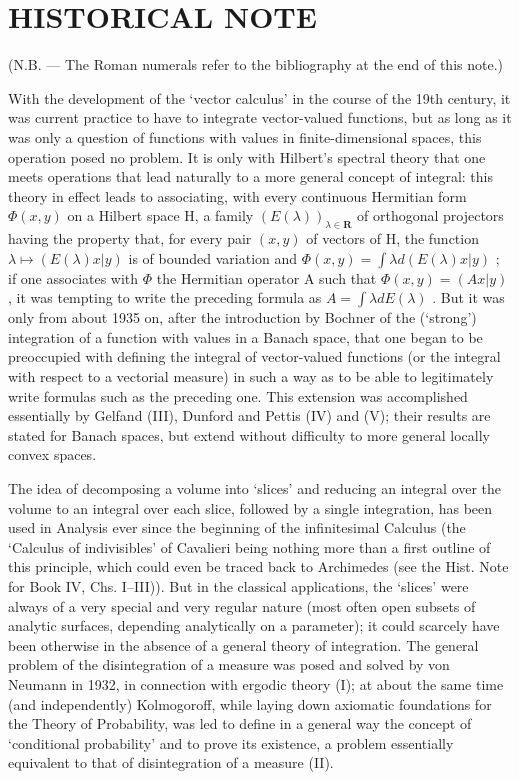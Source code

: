 \chapter*{HISTORICAL NOTE}
{}

(N.B. --- The Roman numerals refer to the bibliography at the end of this note.)

With the development of the `vector calculus' in the course of the 19th century, it was current practice to have to integrate vector-valued functions, but as long as it was only a question of functions with values in finite-dimensional spaces, this operation posed no problem. It is only with Hilbert's spectral theory that one meets operations that lead naturally to a more general concept of integral: this theory in effect leads to associating, with every continuous Hermitian form \(\Phi(x,y)\) on a Hilbert space H, a family \((E(\lambda))_{\lambda\in\mathbf{R}}\) of orthogonal projectors having the property that, for every pair \((x,y)\) of vectors of H, the function \(\lambda\mapsto(E(\lambda)x|y)\) is of bounded variation and \(\Phi(x,y)=\int\lambda d(E(\lambda)x|y)\) ; if one associates with \(\Phi\) the Hermitian operator A such that \(\Phi(x,y)=(Ax|y)\) , it was tempting to write the preceding formula as \(A=\int\lambda dE(\lambda)\) . But it was only from about 1935 on, after the introduction by Bochner of the (`strong') integration of a function with values in a Banach space, that one began to be preoccupied with defining the integral of vector-valued functions (or the integral with respect to a vectorial measure) in such a way as to be able to legitimately write formulas such as the preceding one. This extension was accomplished essentially by Gelfand (III), Dunford and Pettis (IV) and (V); their results are stated for Banach spaces, but extend without difficulty to more general locally convex spaces.

The idea of decomposing a volume into `slices' and reducing an integral over the volume to an integral over each slice, followed by a single integration, has been used in Analysis ever since the beginning of the infinitesimal Calculus (the `Calculus of indivisibles' of Cavalieri being nothing more than a first outline of this principle, which could even be traced back to Archimedes (see the Hist. Note for Book IV, Chs. I--III)). But in the classical applications, the `slices' were always of a very special and very regular nature (most often open subsets of analytic surfaces, depending analytically on a parameter); it could scarcely have been otherwise in the absence of a general theory of integration. The general problem of the disintegration of a measure was posed and solved by von Neumann in 1932, in connection with ergodic theory (I); at about the same time (and independently) Kolmogoroff, while laying down axiomatic foundations for the Theory of Probability, was led to define in a general way the concept of `conditional probability' and to prove its existence, a problem essentially equivalent to that of disintegration of a measure (II).

